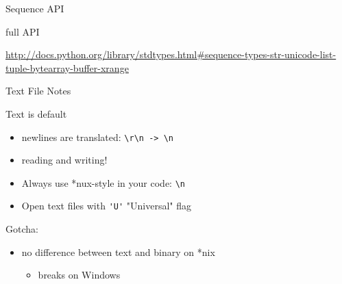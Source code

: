 \documentclass{beamer}
\begin{document}
\begin{frame}[fragile]{Sequence API}

  {\Large full API}

\url{http://docs.python.org/library/stdtypes.html#sequence-types-str-unicode-list-tuple-bytearray-buffer-xrange}

\end{frame}

\begin{frame}[fragile]{Text File Notes}

{\Large Text is default}
\begin{itemize}
  \item newlines are translated: \verb|\r\n -> \n|
  \item reading and writing!
  \item Always use *nux-style in your code: \verb|\n|
  \item Open text files with \verb|'U'| "Universal" flag
\end{itemize}

\vfill
{\Large Gotcha:}
\begin{itemize}
  \item  no difference between text and binary on *nix\\
  \begin{itemize}
    \item breaks on Windows
  \end{itemize}
\end{itemize}

\end{frame}
\end{document}
